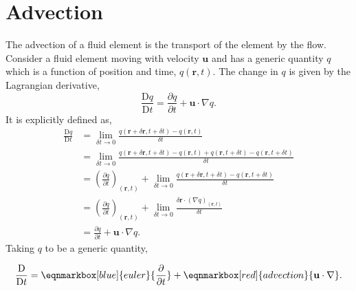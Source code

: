 \section{Advection}
The \textsf{advection} of a fluid element is the transport of the element by the flow. Consider a fluid element moving with velocity $\mathbf{u}$ and has a generic quantity $q$ which is a function of position and time, $q(\mathbf{r},t)$. The change in $q$ is given by the \textsf{Lagrangian derivative},
\begin{equation}
  \frac{\text{D}q}{\text{D}t} = \frac{\partial q}{\partial t} + \mathbf{u}\cdot\nabla q. 
\end{equation}
It is explicitly defined as, 
\begin{equation}
  \begin{aligned}
    \frac{\text{D}q}{\text{D}t} &=\lim_{\delta t\to0}\frac{q(\mathbf{r}+\delta \mathbf{r},t+\delta t) - q(\mathbf{r},t)}{\delta t}\\ 
                  &= \lim_{\delta t\to0}\frac{q(\mathbf{r}+\delta \mathbf{r},t+\delta t) - q(\mathbf{r},t) + q(\mathbf{r}, t+\delta t) - q(\mathbf{r}, t+\delta t)}{\delta t}\\
                  &=  \left(\frac{\partial q}{\partial t}\right)_{(\mathbf{r}, t)} + \lim_{\delta t\to0}\frac{q(\mathbf{r}+\delta \mathbf{r},t+\delta t)  - q(\mathbf{r}, t+\delta t)}{\delta t}\\
                  &= \left(\frac{\partial q}{\partial t}\right)_{(\mathbf{r}, t)} + \lim_{\delta t\to0}\frac{ \delta\mathbf{r}\cdot(\nabla q)_{(\mathbf{r}, t)}}{\delta t}\\
                  &= \frac{\partial q}{\partial t} + \mathbf{u}\cdot\nabla q.
  \end{aligned}
\end{equation}
Taking $q$ to be a generic quantity, 
\begin{definition}
\begin{equation}
  \frac{\text{D}}{\text{D}t} = \eqnmarkbox[blue]{euler}{\frac{\partial}{\partial t}} + \eqnmarkbox[red]{advection}{\mathbf{u}\cdot\nabla}. 
\end{equation}
\vspace{0cm}
\end{definition}


